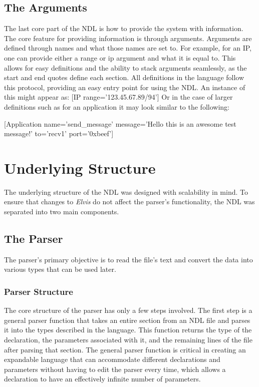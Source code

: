 \documentclass[journal]{IEEEtran} %
\newcommand{\elvis}{\textit{Elvis}}
\begin{document}
\subsection{The Arguments}
The last core part of the NDL is how to provide the system with information. The core feature for providing information is through arguments. Arguments are defined through names and what those names are set to. For example, for an IP, one can provide either a range or ip argument and what it is equal to. This allows for easy definitions and the ability to stack arguments seamlessly, as the start and end quotes define each section. All definitions in the language follow this protocol, providing an easy entry point for using the NDL. An instance of this might appear as:
[IP range=’123.45.67.89/94’]
Or in the case of larger definitions such as for an application it may look similar to the following:

[Application name='send\_message' message='Hello this is an awesome test message!' to='recv1' port='0xbeef']

\section{Underlying Structure}
The underlying structure of the NDL was designed with scalability in mind. To ensure that changes to \elvis{} do not affect the parser's functionality, the NDL was separated into two main components.

\subsection{The Parser}
The parser's primary objective is to read the file's text and convert the data into various types that can be used later.
\subsubsection{Parser Structure}
The core structure of the parser has only a few steps involved. The first step is a general parser function that takes an entire section from an NDL file and parses it into the types described in the language. This function returns the type of the declaration, the parameters associated with it, and the remaining lines of the file after parsing that section. The general parser function is critical in creating an expandable language that can accommodate different declarations and parameters without having to edit the parser every time, which allows a declaration to have an effectively infinite number of parameters.
\end{document}

